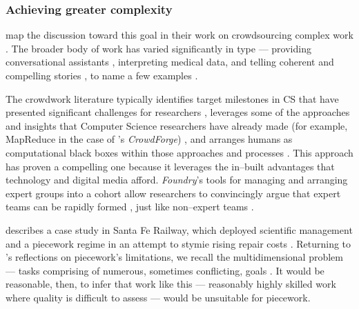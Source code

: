 \documentclass[trackingWork]{subfiles}
\begin{document}
\subsubsection[finding crowdwork's limits]{Achieving greater complexity}\label{sec:complexity}
\subsubsubsection{\crowdworkpers}
\citeauthor{crowdForgeKittur}
map the discussion toward this goal in their work on
crowdsourcing complex work
\cite{crowdForgeKittur}.
The broader body of work has varied significantly in type
--- providing conversational assistants%
, interpreting medical data, and
telling coherent and compelling stories%
, to name a few examples
\cite{Lasecki:2013:CCC:2501988.2502057,mavandadi2012distributed,KimStoria}.

The crowdwork literature typically identifies target milestones in CS
that have presented significant challenges for researchers%
, leverages some of the approaches and insights that Computer Science researchers have already made
(for example, MapReduce in the case of \citeauthor{crowdForgeKittur}'s \textit{CrowdForge})%
, and arranges humans as computational black boxes within those approaches and processes
\cite[][and others]{crowdForgeKittur,foundry}.
This approach has proven a compelling one because
it leverages the in--built advantages that technology and digital media afford.
\textit{Foundry}'s tools for managing and arranging expert groups into a cohort
allow researchers to convincingly argue that expert teams can be rapidly formed%
, just like non--expert teams
\cite{foundry}.



\subsubsubsection{\pieceworkpers}
\citeauthor{10.2307/23702539} describes a case study in Santa Fe Railway, which
deployed scientific management and a piecework regime in an attempt to stymie rising repair costs
\cite{10.2307/23702539}.
Returning to \citeauthor{hart2016rise}'s reflections on piecework's limitations,
we recall the multidimensional problem
--- tasks comprising of numerous, sometimes conflicting, goals
\cite{hart2016rise}.
It would be reasonable, then, to infer that work like this
--- reasonably highly skilled work where quality is difficult to assess ---
would be unsuitable for piecework.
\end{document}
